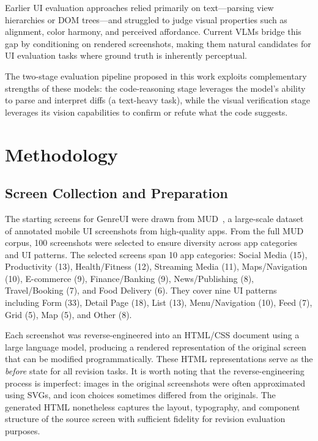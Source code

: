 \documentclass[sigconf,nonacm]{acmart}
\begin{document}
Earlier UI evaluation approaches relied primarily on text—parsing view hierarchies or DOM trees—and struggled to judge visual properties such as alignment, color harmony, and perceived affordance. Current VLMs bridge this gap by conditioning on rendered screenshots, making them natural candidates for UI evaluation tasks where ground truth is inherently perceptual.

The two-stage evaluation pipeline proposed in this work exploits complementary strengths of these models: the code-reasoning stage leverages the model's ability to parse and interpret diffs (a text-heavy task), while the visual verification stage leverages its vision capabilities to confirm or refute what the code suggests.

\section{Methodology}
\label{sec:methodology}

\subsection{Screen Collection and Preparation}

The starting screens for GenreUI were drawn from MUD~\cite{feng2024mud}, a large-scale dataset of annotated mobile UI screenshots from high-quality apps. From the full MUD corpus, 100 screenshots were selected to ensure diversity across app categories and UI patterns. The selected screens span 10 app categories: Social Media (15), Productivity (13), Health/Fitness (12), Streaming Media (11), Maps/Navigation (10), E-commerce (9), Finance/Banking (9), News/Publishing (8), Travel/Booking (7), and Food Delivery (6). They cover nine UI patterns including Form (33), Detail Page (18), List (13), Menu/Navigation (10), Feed (7), Grid (5), Map (5), and Other (8).

Each screenshot was reverse-engineered into an HTML/CSS document using a large language model, producing a rendered representation of the original screen that can be modified programmatically. These HTML representations serve as the \emph{before} state for all revision tasks. It is worth noting that the reverse-engineering process is imperfect: images in the original screenshots were often approximated using SVGs, and icon choices sometimes differed from the originals. The generated HTML nonetheless captures the layout, typography, and component structure of the source screen with sufficient fidelity for revision evaluation purposes.
\end{document}
